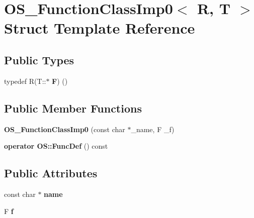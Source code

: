 \hypertarget{struct_o_s___function_class_imp0}{}\section{O\+S\+\_\+\+Function\+Class\+Imp0$<$ R, T $>$ Struct Template Reference}
\label{struct_o_s___function_class_imp0}
\subsection*{Public Types}
\begin{DoxyCompactItemize}
\item 
typedef R(T\+::$\ast$ {\bfseries F}) ()\hypertarget{struct_o_s___function_class_imp0_a4a418a3ed70c94c62846ea7683f713c8}{}\label{struct_o_s___function_class_imp0_a4a418a3ed70c94c62846ea7683f713c8}

\end{DoxyCompactItemize}
\subsection*{Public Member Functions}
\begin{DoxyCompactItemize}
\item 
{\bfseries O\+S\+\_\+\+Function\+Class\+Imp0} (const char $\ast$\+\_\+name, F \+\_\+f)\hypertarget{struct_o_s___function_class_imp0_a895cac08a304f85507b1764b0ac7c9d8}{}\label{struct_o_s___function_class_imp0_a895cac08a304f85507b1764b0ac7c9d8}

\item 
{\bfseries operator O\+S\+::\+Func\+Def} () const \hypertarget{struct_o_s___function_class_imp0_a3b19f6c27eae89469e3c19c3657507e1}{}\label{struct_o_s___function_class_imp0_a3b19f6c27eae89469e3c19c3657507e1}

\end{DoxyCompactItemize}
\subsection*{Public Attributes}
\begin{DoxyCompactItemize}
\item 
const char $\ast$ {\bfseries name}\hypertarget{struct_o_s___function_class_imp0_ab0e1e6ff17b3717d2355ab00e382ec86}{}\label{struct_o_s___function_class_imp0_ab0e1e6ff17b3717d2355ab00e382ec86}

\item 
F {\bfseries f}\hypertarget{struct_o_s___function_class_imp0_ac9aec4344ab58f613ae4c3276fdc16d7}{}\label{struct_o_s___function_class_imp0_ac9aec4344ab58f613ae4c3276fdc16d7}

\end{DoxyCompactItemize}



